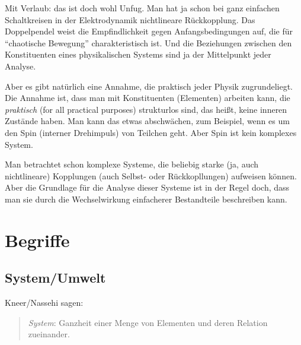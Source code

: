 \documentclass[a4paper, 10pt]{amsart}
\begin{document}
Mit Verlaub: das ist doch wohl Unfug. Man hat ja schon bei ganz einfachen Schaltkreisen in der Elektrodynamik nichtlineare R\"uckkopplung. Das Doppelpendel weist die Empfindlichkeit gegen Anfangsbedingungen auf, die f\"ur ``chaotische Bewegung'' charakteristisch ist. Und die Beziehungen zwischen den Konstituenten eines physikalischen Systems sind ja der Mittelpunkt jeder Analyse.

Aber es gibt nat\"urlich eine Annahme, die praktisch jeder Physik zugrundeliegt. Die Annahme ist, dass man mit Konstituenten (Elementen) arbeiten kann, die \emph{praktisch} (for all practical purposes) strukturlos sind, das hei{\ss}t, keine inneren Zust\"ande haben. Man kann das etwas abschw\"achen, zum Beispiel, wenn es um den Spin (interner Drehimpuls) von Teilchen geht. Aber Spin ist kein komplexes System.

Man betrachtet schon komplexe Systeme, die beliebig starke (ja, auch nichtlineare) Kopplungen (auch Selbst- oder R\"uckkopllungen) aufweisen k\"onnen. Aber die Grundlage f\"ur die Analyse dieser Systeme ist in der Regel doch, dass man sie durch die Wechselwirkung einfacherer Bestandteile beschreiben kann.
%
%
%
\section{Begriffe}
\subsection{System/Umwelt}
Kneer/Nassehi \cite{kneerNiklasLuhmannsTheorie1993} sagen:
\begin{quote}
\emph{System}: Ganzheit einer Menge von Elementen und deren Relation zueinander.
\end{quote}
\end{document}
